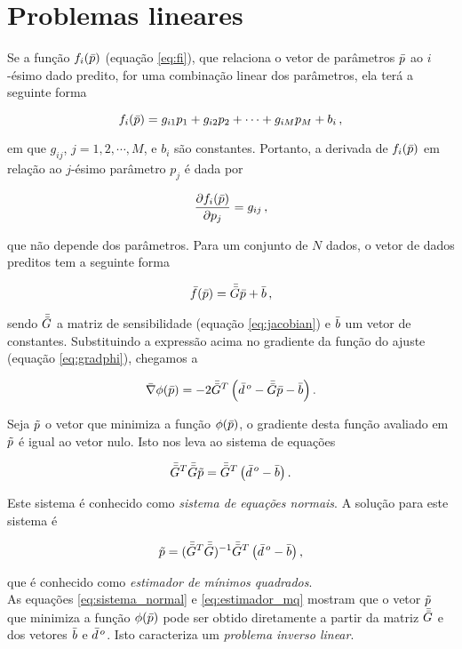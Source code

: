 \section{Problemas lineares}

Se a função $f_i(\bar{p})$ (equação \ref{eq:fi}), que relaciona o vetor de
parâmetros $\bar{p}$ ao $i$-ésimo dado predito, for uma combinação linear dos
parâmetros, ela terá a seguinte forma

\begin{equation}
f_i(\bar{p}) = g_{i1}p_1 + g_{i2}p_2 + \dotsb + g_{iM}p_M + b_i \thinspace ,
\end{equation}

\noindent em que $g_{ij}$, $j = 1, 2, \cdots, M$, e $b_i$ são constantes.
Portanto, a derivada de $f_i(\bar{p})$ em relação ao $j$-ésimo parâmetro
$p_j$ é dada por

\begin{equation}
\dfrac{\partial f_i(\bar{p})}{\partial p_j} = g_{ij} \thinspace ,
\end{equation}

\noindent que não depende dos parâmetros. Para um conjunto de $N$ dados, o vetor
de dados preditos tem a seguinte forma

\begin{equation}
\bar{f}(\bar{p}) = \bar{\bar{G}}\bar{p} + \bar{b} \thinspace ,
\end{equation}

\noindent sendo $\bar{\bar{G}}$ a matriz de sensibilidade (equação \ref{eq:jacobian})
e $\bar{b}$ um vetor de constantes.
Substituindo a expressão acima no gradiente da função do ajuste (equação
\ref{eq:gradphi}), chegamos a

\begin{equation}
\bar{\nabla}\phi(\bar{p}) = -2\bar{\bar{G}}^T \left(\bar{d}^{\thinspace o} -
    \bar{\bar{G}}\bar{p} - \bar{b} \right).
\end{equation}

\indent Seja $\tilde{p}$ o vetor que minimiza a função $\phi(\bar{p})$, o
gradiente desta função avaliado em $\tilde{p}$ é igual ao vetor nulo.
Isto nos leva ao sistema de equações

\begin{equation}
\bar{\bar{G}}^T\bar{\bar{G}}\tilde{p} = \bar{\bar{G}}^T\left(\bar{d}^{\thinspace o} - \bar{b} \right).
\label{eq:sistema_normal}
\end{equation}

\noindent Este sistema é conhecido como {\it sistema de equações normais}. A
solução para este sistema é

\begin{equation}
\tilde{p} = (\bar{\bar{G}}^T\bar{\bar{G}})^{-1} \bar{\bar{G}}^T
    \left(\bar{d}^{\thinspace o} - \bar{b} \right),
\label{eq:estimador_mq}
\end{equation}

\noindent que é conhecido como {\it estimador de mínimos quadrados}.
\\
\indent As equações \ref{eq:sistema_normal} e \ref{eq:estimador_mq} mostram que 
o vetor $\tilde{p}$ que minimiza a função $\phi(\bar{p})$ pode ser
obtido diretamente a partir da matriz $\bar{\bar{G}}$ e dos vetores $\bar{b}$ e
$\bar{d}^{\thinspace o}$. Isto caracteriza um {\it problema inverso linear}.
